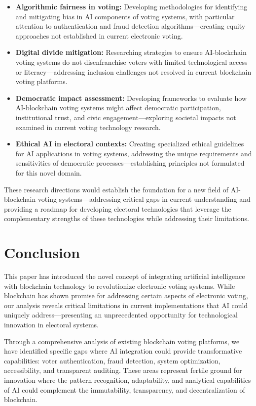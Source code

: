 \documentclass[conference]{IEEEtran}
\begin{document}
\begin{itemize}
    \item \textbf{Algorithmic fairness in voting:} Developing methodologies for identifying and mitigating bias in AI components of voting systems, with particular attention to authentication and fraud detection algorithms—creating equity approaches not established in current electronic voting.
    
    \item \textbf{Digital divide mitigation:} Researching strategies to ensure AI-blockchain voting systems do not disenfranchise voters with limited technological access or literacy—addressing inclusion challenges not resolved in current blockchain voting platforms.
    
    \item \textbf{Democratic impact assessment:} Developing frameworks to evaluate how AI-blockchain voting systems might affect democratic participation, institutional trust, and civic engagement—exploring societal impacts not examined in current voting technology research.
    
    \item \textbf{Ethical AI in electoral contexts:} Creating specialized ethical guidelines for AI applications in voting systems, addressing the unique requirements and sensitivities of democratic processes—establishing principles not formulated for this novel domain.
\end{itemize}

These research directions would establish the foundation for a new field of AI-blockchain voting systems—addressing critical gaps in current understanding and providing a roadmap for developing electoral technologies that leverage the complementary strengths of these technologies while addressing their limitations.

\section{Conclusion}
This paper has introduced the novel concept of integrating artificial intelligence with blockchain technology to revolutionize electronic voting systems. While blockchain has shown promise for addressing certain aspects of electronic voting, our analysis reveals critical limitations in current implementations that AI could uniquely address—presenting an unprecedented opportunity for technological innovation in electoral systems.

Through a comprehensive analysis of existing blockchain voting platforms, we have identified specific gaps where AI integration could provide transformative capabilities: voter authentication, fraud detection, system optimization, accessibility, and transparent auditing. These areas represent fertile ground for innovation where the pattern recognition, adaptability, and analytical capabilities of AI could complement the immutability, transparency, and decentralization of blockchain.
\end{document}
